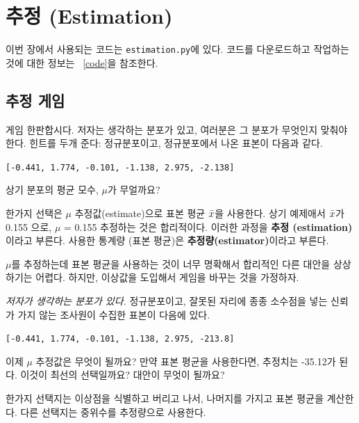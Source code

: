 

\chapter{추정 (Estimation)}
\label{estimation}

이번 장에서 사용되는 코드는 {\tt estimation.py}에 있다.
코드를 다운로드하고 작업하는 것에 대한 정보는 ~\ref{code}을 참조한다.


\section{추정 게임}

게임 한판합시다. 저자는 생각하는 분포가 있고, 여러분은 그 분포가 무엇인지 맞춰야 한다.
힌트를 두개 준다: 정규분포이고, 정규분포에서 나온 표본이 다음과 같다.


{\tt [-0.441, 1.774, -0.101, -1.138, 2.975, -2.138]}

상기 분포의 평균 모수, $\mu$가 무얼까요?

한가지 선택은 $\mu$ 추정값(estimate)으로 표본 평균 $\bar{x}$을 사용한다.
상기 예제애서 $\bar{x}$가 0.155 으로, $\mu$ = 0.155 추정하는 것은 합리적이다.
이러한 과정을 {\bf 추정 (estimation)}이라고 부른다. 사용한 통계량 (표본 평균)은 
{\bf 추정량(estimator)}이라고 부른다.

$\mu$를 추정하는데 표본 평균을 사용하는 것이 너무 명확해서 합리적인 다른 대안을 상상하기는 어렵다.
하지만, 이상값을 도입해서 게임을 바꾸는 것을 가정하자.

{\em 저자가 생각하는 분포가 있다.} 정규분포이고, 잘못된 자리에 종종 소수점을 넣는
신뢰가 가지 않는 조사원이 수집한 표본이 다음에 있다.

{\tt [-0.441, 1.774, -0.101, -1.138, 2.975, -213.8]}

이제 $\mu$ 추정값은 무엇이 될까요? 만약 표본 평균을 사용한다면, 추정치는 -35.12가 된다.
이것이 최선의 선택일까요? 대안이 무엇이 될까요?

한가지 선택지는 이상점을 식별하고 버리고 나서, 나머지를 가지고 표본 평균을 계산한다.
다른 선택지는 중위수를 추정량으로 사용한다.

